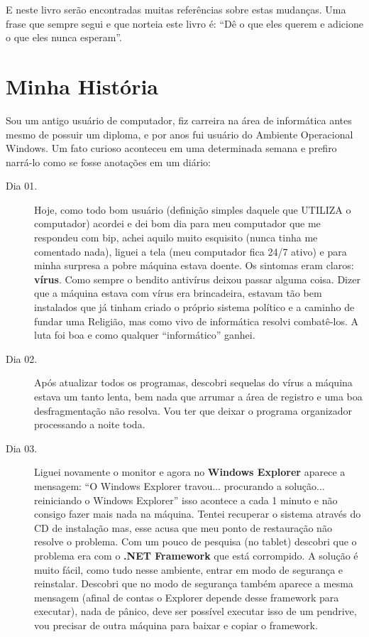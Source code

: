 E neste livro serão encontradas muitas referências sobre estas mudanças. Uma frase que sempre segui e que norteia este livro é: ``Dê o que eles querem e adicione o que eles nunca esperam''.

\section{Minha História}
Sou um antigo usuário de computador, fiz carreira na área de informática antes mesmo de possuir um diploma, e por anos fui usuário do Ambiente Operacional Windows. Um fato curioso aconteceu em uma determinada semana e prefiro narrá-lo como se fosse anotações em um diário:
\begin{description}
 \item[Dia 01.] Hoje, como todo bom usuário (definição simples daquele que UTILIZA o computador) acordei e dei bom dia para meu computador que me respondeu com bip, achei aquilo muito esquisito (nunca tinha me comentado nada), liguei a tela (meu computador fica 24/7 ativo) e para minha surpresa a pobre máquina estava doente. Os sintomas eram claros: \textbf{vírus}. Como sempre o bendito antivírus deixou passar alguma coisa. Dizer que a máquina estava com vírus era brincadeira, estavam tão bem instalados que já tinham criado o próprio sistema político e a caminho de fundar uma Religião, mas como vivo de informática resolvi combatê-los. A luta foi boa e como qualquer ``informático'' ganhei.
 \item[Dia 02.] Após atualizar todos os programas, descobri sequelas do vírus a máquina estava um tanto lenta, bem nada que arrumar a área de registro e uma boa desfragmentação não resolva. Vou ter que deixar o programa organizador processando a noite toda.
 \item[Dia 03.] Liguei novamente o monitor e agora no \textbf{Windows Explorer} aparece a mensagem: ``O Windows Explorer travou... procurando a solução... reiniciando o Windows Explorer'' isso acontece a cada 1 minuto e não consigo fazer mais nada na máquina. Tentei recuperar o sistema através do CD de instalação mas, esse acusa que meu ponto de restauração não resolve o problema. Com um pouco de pesquisa (no tablet) descobri que o problema era com o \textbf{.NET Framework} que está corrompido. A solução é muito fácil, como tudo nesse ambiente, entrar em modo de segurança e reinstalar. Descobri que no modo de segurança também aparece a mesma mensagem (afinal de contas o Explorer depende desse framework para executar), nada de pânico, deve ser possível executar isso de um pendrive, vou precisar de outra máquina para baixar e copiar o framework.

\end{description}
